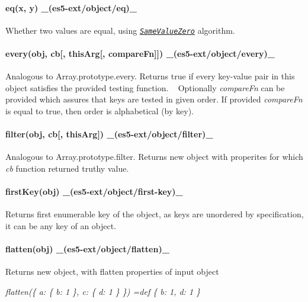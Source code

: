 \paragraph*{eq(x, y) \+\_\+(es5-\/ext/object/eq)\+\_\+}

Whether two values are equal, using \href{http://people.mozilla.org/~jorendorff/es6-draft.html#sec-samevaluezero}{\tt {\itshape Same\+Value\+Zero}} algorithm.

\paragraph*{every(obj, cb\mbox{[}, this\+Arg\mbox{[}, compare\+Fn\mbox{]}\mbox{]}) \+\_\+(es5-\/ext/object/every)\+\_\+}

Analogous to Array.\+prototype.\+every. Returns true if every key-\/value pair in this object satisfies the provided testing function. ~\newline
Optionally {\itshape compare\+Fn} can be provided which assures that keys are tested in given order. If provided {\itshape compare\+Fn} is equal to {\ttfamily true}, then order is alphabetical (by key).

\paragraph*{filter(obj, cb\mbox{[}, this\+Arg\mbox{]}) \+\_\+(es5-\/ext/object/filter)\+\_\+}

Analogous to Array.\+prototype.\+filter. Returns new object with properites for which {\itshape cb} function returned truthy value.

\paragraph*{first\+Key(obj) \+\_\+(es5-\/ext/object/first-\/key)\+\_\+}

Returns first enumerable key of the object, as keys are unordered by specification, it can be any key of an object.

\paragraph*{flatten(obj) \+\_\+(es5-\/ext/object/flatten)\+\_\+}

Returns new object, with flatten properties of input object

{\itshape flatten(\{ a\+: \{ b\+: 1 \}, c\+: \{ d\+: 1 \} \}) =def \{ b\+: 1, d\+: 1 \}}

